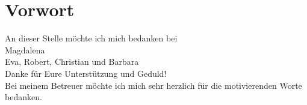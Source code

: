 \chapter{Vorwort}

\begin{centering}

An dieser Stelle möchte ich mich bedanken bei\\
Magdalena\\
Eva, Robert, Christian und Barbara\\
Danke für Eure Unterstützung und Geduld!\\
Bei meinem Betreuer möchte ich mich
sehr herzlich für die motivierenden Worte bedanken.

\end{centering}